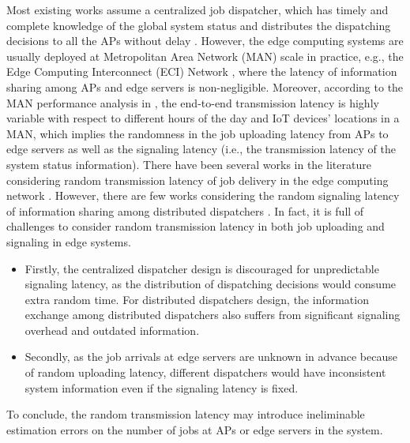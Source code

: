 Most existing works assume a centralized job dispatcher, which has timely and complete knowledge of the global system status and distributes the dispatching decisions to all the APs without delay \cite{tan-online,IOTJ18-FanQ,mdp-globecom,mdp-tvt,MASS18-MengZ}.
However, the edge computing systems are usually deployed at Metropolitan Area Network (MAN) scale in practice, e.g., the Edge Computing Interconnect (ECI) Network \cite{MAN-ECI}, where the latency of information sharing among APs and edge servers is non-negligible. Moreover, according to the MAN performance analysis in \cite{MAN-LATENCY}, the end-to-end transmission latency is highly variable with respect to different hours of the day and IoT devices' locations in a MAN, which implies the randomness in the job uploading latency from APs to edge servers as well as the signaling latency (i.e., the transmission latency of the {system status} information).
There have been several works in the literature considering random transmission latency of job delivery in the edge computing network \cite{latency-EDGE19,MOBIHOC19-ZhouZ,IOTJ18-FanQ,TOC19-LiuC,JSAC19-AlameddineHA}.
However, there are few works considering the random signaling latency of information sharing among distributed dispatchers \cite{tan-online,TWC18-LyuX}.
In fact, it is full of {challenges} to consider random transmission latency in both job uploading and signaling in edge systems.
\begin{itemize}
    \item Firstly, the centralized dispatcher design is discouraged for unpredictable signaling latency, as the distribution of dispatching decisions would consume extra random time. For distributed dispatchers design, the information exchange among distributed dispatchers also suffers from significant signaling overhead and outdated information.
    \item Secondly, as the job arrivals at edge servers are unknown in advance because of random uploading latency, different dispatchers would have inconsistent system information even if the signaling latency is fixed.
\end{itemize}

To conclude, the random transmission latency may introduce ineliminable estimation errors on the number of jobs at APs or edge servers in the system.


